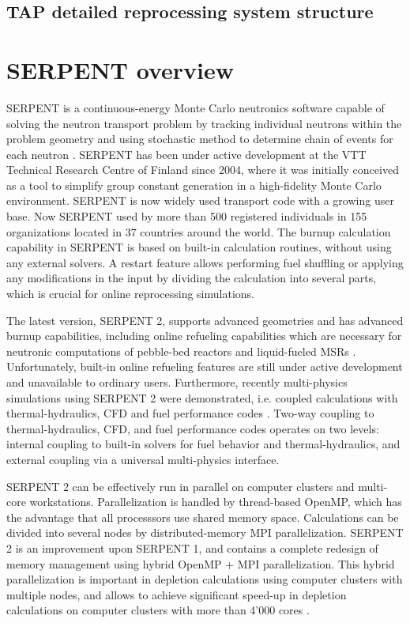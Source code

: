 \subsection{TAP detailed reprocessing system structure}

\section{SERPENT overview}
SERPENT is a continuous-energy Monte Carlo neutronics software capable of solving the neutron transport problem by tracking individual neutrons within the problem geometry and using stochastic method to determine chain of events for each neutron \cite{leppanen_serpent_2015}. SERPENT has been under active development at the VTT Technical Research Centre of Finland since 2004, where it was initially conceived as a tool to simplify group constant generation in a high-fidelity Monte Carlo environment. SERPENT is now widely used transport code  with a growing user base. Now SERPENT used by more than 500 registered individuals in 155 organizations located in 37 countries around the world. The burnup calculation capability in SERPENT is based on built-in calculation routines, without using any external solvers. A restart feature allows performing fuel shuffling or applying any modifications in the input by dividing the calculation into several parts, which is crucial for online reprocessing simulations.

The latest version, SERPENT 2, supports advanced geometries and has advanced burnup capabilities, including online refueling capabilities which are necessary for neutronic computations of pebble-bed reactors and liquid-fueled \glspl{MSR} \cite{aufiero_extended_2013}. Unfortunately, built-in online refueling features are still under active development and unavailable to ordinary users. Furthermore, recently multi-physics simulations using SERPENT 2 were demonstrated, i.e. coupled calculations with thermal-hydraulics, \gls{CFD} and fuel performance codes \cite{leppanen_numerical_2015}. Two-way coupling to thermal-hydraulics, \gls{CFD}, and fuel performance codes operates on two levels: internal coupling to built-in solvers for fuel behavior and thermal-hydraulics, and external coupling via a universal multi-physics interface. 

SERPENT 2 can be effectively run in parallel on computer clusters and multi-core workstations. Parallelization is handled by thread-based OpenMP, which has the advantage that all processsors use shared memory space. Calculations can be divided into several nodes by distributed-memory \gls{MPI} parallelization. SERPENT 2  is an improvement upon SERPENT 1, and contains a complete redesign of memory management using hybrid OpenMP \cite{dagum_openmp_1998} + \gls{MPI} parallelization.  This hybrid parallelization is important in depletion calculations using computer clusters with multiple nodes, and allows to achieve significant speed-up in depletion calculations on computer clusters with more than 4'000 cores \cite{leppanen_serpent_2015}. 

